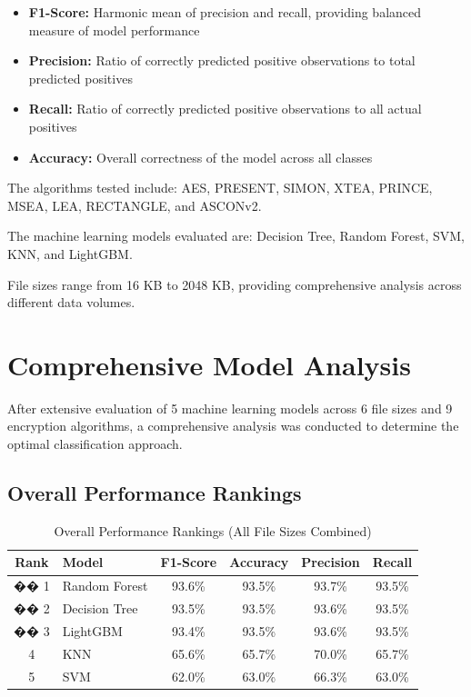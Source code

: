 \documentclass[12pt]{article}
\begin{document}
\begin{itemize}
    \item \textbf{F1-Score:} Harmonic mean of precision and recall, providing balanced measure of model performance
    \item \textbf{Precision:} Ratio of correctly predicted positive observations to total predicted positives
    \item \textbf{Recall:} Ratio of correctly predicted positive observations to all actual positives
    \item \textbf{Accuracy:} Overall correctness of the model across all classes
\end{itemize}

The algorithms tested include: AES, PRESENT, SIMON, XTEA, PRINCE, MSEA, LEA, RECTANGLE, and ASCONv2.

The machine learning models evaluated are: Decision Tree, Random Forest, SVM, KNN, and LightGBM.

File sizes range from 16 KB to 2048 KB, providing comprehensive analysis across different data volumes.

\section{Comprehensive Model Analysis}

After extensive evaluation of 5 machine learning models across 6 file sizes and 9 encryption algorithms, a comprehensive analysis was conducted to determine the optimal classification approach.

\subsection{Overall Performance Rankings}

\begin{table}[h!]
\centering
\caption{Overall Performance Rankings (All File Sizes Combined)}
\label{tab:overall_rankings}
\begin{tabular}{|c|l|c|c|c|c|}
\hline
\textbf{Rank} & \textbf{Model} & \textbf{F1-Score} & \textbf{Accuracy} & \textbf{Precision} & \textbf{Recall} \\
\hline
�� 1 & Random Forest & 93.6\% & 93.5\% & 93.7\% & 93.5\% \\
\hline
�� 2 & Decision Tree & 93.5\% & 93.5\% & 93.6\% & 93.5\% \\
\hline
�� 3 & LightGBM & 93.4\% & 93.5\% & 93.6\% & 93.5\% \\
\hline
4 & KNN & 65.6\% & 65.7\% & 70.0\% & 65.7\% \\
\hline
5 & SVM & 62.0\% & 63.0\% & 66.3\% & 63.0\% \\
\hline
\end{tabular}
\end{table}
\end{document}
